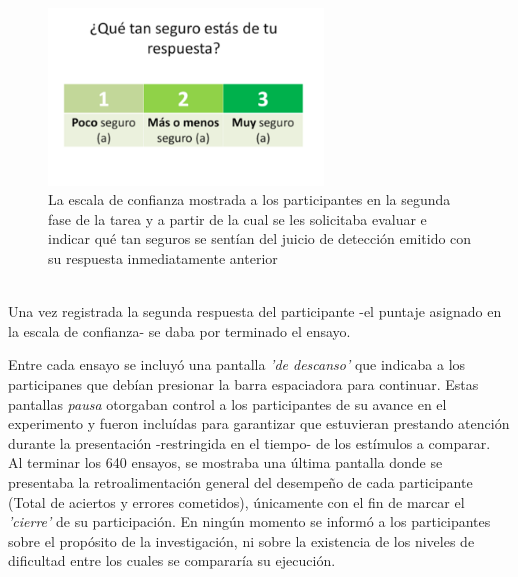 \begin{itemize}
\begin{itemize}
\begin{figure}[th]
\centering
\includegraphics[width=0.65\textwidth]{Figures/Ejemplo_Escala}
\caption[Presentación de la escala de confianza]{La escala de confianza mostrada a los participantes en la segunda fase de la tarea y  a partir de la cual se les solicitaba evaluar e indicar qué tan seguros se sentían del juicio de detección emitido con su respuesta inmediatamente anterior}
\label{fig:Ejem_Esc}
\end{figure}\\

Una vez registrada la segunda respuesta del participante -el puntaje asignado en la escala de confianza- se daba por terminado el ensayo.\\

\end{itemize}

Entre cada ensayo se incluyó una pantalla \textit{'de descanso'} que indicaba a los participanes que debían presionar la barra espaciadora para continuar. Estas pantallas \textit{pausa} otorgaban control a los participantes de su avance en el experimento y fueron incluídas para garantizar que estuvieran prestando atención durante la presentación -restringida en el tiempo- de los estímulos a comparar.\\

Al terminar los 640 ensayos, se mostraba una última pantalla donde se presentaba la retroalimentación general del desempeño de cada participante (Total de aciertos y errores cometidos), únicamente con el fin de marcar el \textit{'cierre'} de su participación. En ningún momento se informó a los participantes sobre el propósito de la investigación, ni sobre la existencia de los niveles de dificultad entre los cuales se compararía su ejecución.\\ 


\end{itemize}
